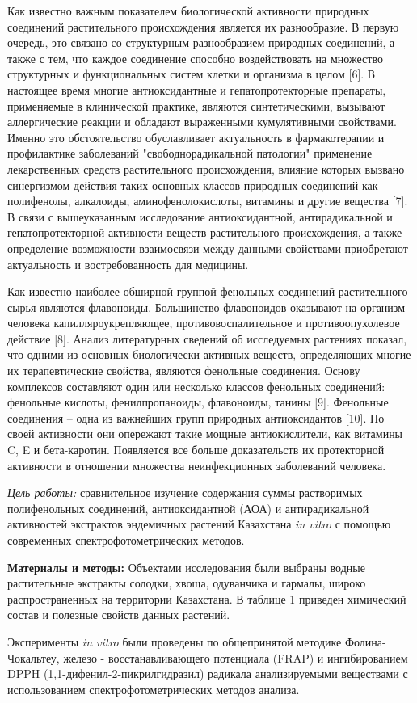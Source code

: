 \begin{multicols}{2}
Как известно важным показателем биологической активности природных
соединений растительного происхождения является их разнообразие. В
первую очередь, это связано со структурным разнообразием природных
соединений, а также с тем, что каждое соединение способно воздействовать
на множество структурных и функциональных систем клетки и организма в
целом {[}6{]}. В настоящее время многие антиоксидантные и
гепатопротекторные препараты, применяемые в клинической практике,
являются синтетическими, вызывают аллергические реакции и обладают
выраженными кумулятивными свойствами. Именно это обстоятельство
обуславливает актуальность в фармакотерапии и профилактике заболеваний
"свободнорадикальной патологии" применение лекарственных средств
растительного происхождения, влияние которых вызвано синергизмом
действия таких основных классов природных соединений как полифенолы,
алкалоиды, аминофенолокислоты, витамины и другие вещества {[}7{]}. В
связи с вышеуказанным исследование антиоксидантной, антирадикальной и
гепатопротекторной активности веществ растительного происхождения, а
также определение возможности взаимосвязи между данными свойствами
приобретают актуальность и востребованность для медицины.

Как известно наиболее обширной группой фенольных соединений
растительного сырья являются флавоноиды. Большинство флавоноидов
оказывают на организм человека капилляроукрепляющее,
противовоспалительное и противоопухолевое действие {[}8{]}. Анализ
литературных сведений об исследуемых растениях показал, что одними из
основных биологически активных веществ, определяющих многие их
терапевтические свойства, являются фенольные соединения. Основу
комплексов составляют один или несколько классов фенольных соединений:
фенольные кислоты, фенилпропаноиды, флавоноиды, танины {[}9{]}.
Фенольные соединения -- одна из важнейших групп природных антиоксидантов
{[}10{]}. По своей активности они опережают такие мощные антиокислители,
как витамины C, E и бета-каротин. Появляется все больше доказательств их
протекторной активности в отношении множества неинфекционных заболеваний
человека.

\emph{Цель работы:} сравнительное изучение содержания суммы растворимых
полифенольных соединений, антиоксидантной (АОА) и антирадикальной
активностей экстрактов эндемичных растений Казахстана \emph{in vitro} с
помощью современных спектрофотометрических методов.

{\bfseries Материалы и методы:} Объектами исследования были выбраны водные
растительные экстракты солодки, хвоща, одуванчика и гармалы, широко
распространенных на территории Казахстана. В таблице 1 приведен
химический состав и полезные свойств данных растений.

Эксперименты \emph{in vitro} были проведены по общепринятой методике
Фолина-Чокальтеу, железо - восстанавливающего потенциала (FRAP) и
ингибированием DPPH (1,1-дифенил-2-пикрилгидразил) радикала
анализируемыми веществами с использованием спектрофотометрических
методов анализа.
\end{multicols}

